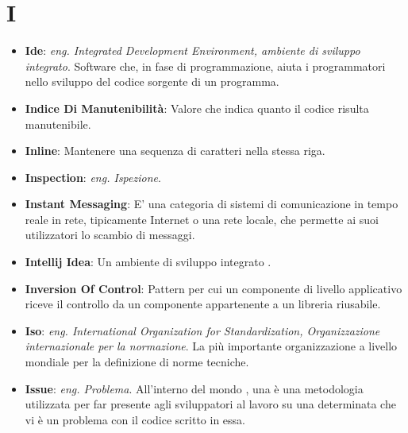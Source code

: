 \section*{I}
\begin{itemize}
	\item
	\textbf{Ide}: \textit{eng. Integrated Development Environment, ambiente di sviluppo integrato}. Software che, in fase di programmazione, aiuta i programmatori nello sviluppo del codice sorgente di un programma.
	\item
	\textbf{Indice Di Manutenibilità}: Valore che indica quanto il codice risulta manutenibile.
	\item
	\textbf{Inline}: Mantenere una sequenza di caratteri nella stessa riga.
	\item
	\textbf{Inspection}: \textit{eng. Ispezione}.
	\item
	\textbf{Instant Messaging}: E' una categoria di sistemi di comunicazione in tempo reale in rete, tipicamente Internet o una rete locale, che permette ai suoi utilizzatori lo scambio di messaggi.
	\item
	\textbf{Intellij Idea}: Un ambiente di sviluppo integrato .
	\item
	\textbf{Inversion Of Control}: Pattern per cui un componente di livello applicativo riceve il controllo da un componente appartenente a un libreria riusabile.
	\item
	\textbf{Iso}: \textit{eng. International Organization for Standardization, Organizzazione internazionale per la normazione}. La più importante organizzazione a livello mondiale per la definizione di norme tecniche.
	\item
	\textbf{Issue}: \textit{eng. Problema}. All'interno del mondo , una  è una metodologia utilizzata per far presente agli sviluppatori al lavoro su una determinata  che vi è un problema con il codice scritto in essa.
\end{itemize}
\newpage